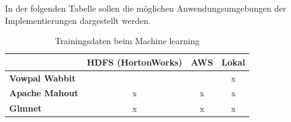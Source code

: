 In der folgenden Tabelle sollen die möglichen Anwendungsumgebungen der Implementierungen dargestellt werden.

\begin{table}[H]
	\centering
\begin{tabular}{l|c|c|c} 
	\textbf{} & \textbf{HDFS (HortonWorks)} & \textbf{AWS} & \textbf{Lokal}  \\  
	\hline \textbf{Vowpal Wabbit} &  &  & x \\
	\hline \textbf{Apache Mahout} & x & x & x \\
	\hline \textbf{Glmnet} & x & x & x 
	\vspace{0.3cm} 
\end{tabular} 
\caption{Trainingsdaten beim Machine learning}
\label{tab:MachineLearningTrainingData}
\end{table}

